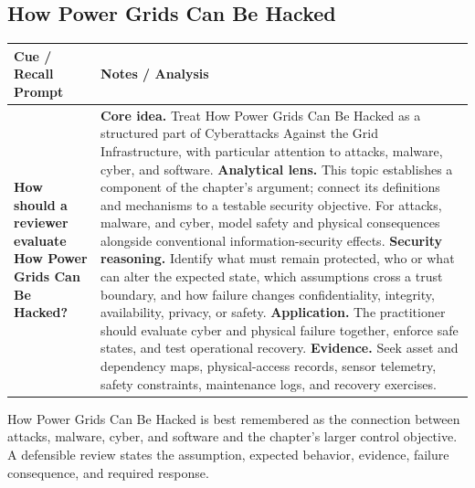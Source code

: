 \documentclass[11pt]{article}
\newcommand{\CornellHeader}{%
\rowcolor{Navy}\color{white}\bfseries Cue / Recall Prompt & \color{white}\bfseries Notes / Analysis\\\hline}
\newcommand{\CornellRow}[2]{%
\cellcolor{CueGray}\RaggedRight\textbf{#1} & \RaggedRight #2\\\hline}
\begin{document}
\subsection*{How Power Grids Can Be Hacked}
\begin{longtable}{>{\RaggedRight\arraybackslash}p{}|>{\RaggedRight\arraybackslash}p{}}
\CornellHeader
\CornellRow{How should a reviewer evaluate How Power Grids Can Be Hacked?}{\textbf{Core idea.} Treat How Power Grids Can Be Hacked as a structured part of Cyberattacks Against the Grid Infrastructure, with particular attention to attacks, malware, cyber, and software. \textbf{Analytical lens.} This topic establishes a component of the chapter's argument; connect its definitions and mechanisms to a testable security objective. For attacks, malware, and cyber, model safety and physical consequences alongside conventional information-security effects. \textbf{Security reasoning.} Identify what must remain protected, who or what can alter the expected state, which assumptions cross a trust boundary, and how failure changes confidentiality, integrity, availability, privacy, or safety. \textbf{Application.} The practitioner should evaluate cyber and physical failure together, enforce safe states, and test operational recovery. \textbf{Evidence.} Seek asset and dependency maps, physical-access records, sensor telemetry, safety constraints, maintenance logs, and recovery exercises.}
\end{longtable}
\begin{topicsummary}
How Power Grids Can Be Hacked is best remembered as the connection between attacks, malware, cyber, and software and the chapter's larger control objective. A defensible review states the assumption, expected behavior, evidence, failure consequence, and required response.
\end{topicsummary}
\end{document}
